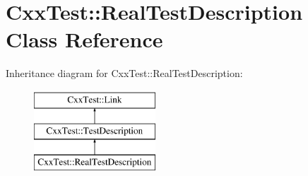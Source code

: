 \hypertarget{classCxxTest_1_1RealTestDescription}{\section{Cxx\-Test\-:\-:Real\-Test\-Description Class Reference}
\label{classCxxTest_1_1RealTestDescription}
}
Inheritance diagram for Cxx\-Test\-:\-:Real\-Test\-Description\-:\begin{figure}[H]
\begin{center}
\leavevmode
\includegraphics[height=3.000000cm]{classCxxTest_1_1RealTestDescription}
\end{center}
\end{figure}

